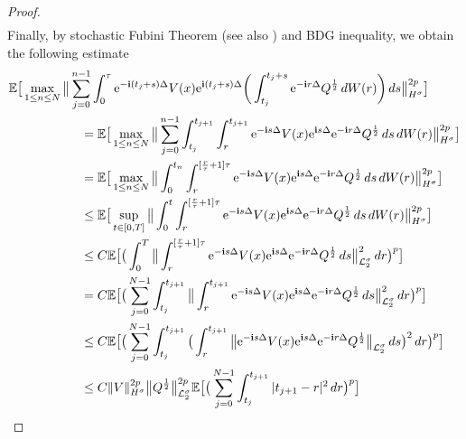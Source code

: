 \documentclass[a4paper]{amsart}
\begin{document}
\begin{proof}
\begin{align*}
\end{align*}
Finally, by stochastic Fubini Theorem (see also \cite{an_co}) and BDG inequality, we obtain the following estimate
\begin{align*}
&\mathbb{E}\big[\max_{1\le n\le N}\big\|\displaystyle\sum_{j=0}^{n-1}\int_{0}^{\tau}{\rm e}^{-{\bf i}(t_j+s)\Delta} V(x){\rm e}^{{\bf i}(t_j+s)\Delta}\bigg(\int_{t_j}^{t_j+s}{\rm e}^{-{\bf i}r \Delta}Q^{\frac{1}{2}}\,dW(r)\bigg)\,ds\big\|^{2p}_{H^\sigma}\big]\\
    &\hspace{2cm}=\mathbb{E}\big[\max_{1\le n\le N}\big\|\displaystyle\sum_{j=0}^{n-1}\int_{t_j}^{t_{j+1}}\int_{r}^{t_{j+1}}{\rm e}^{-{\bf i}s\Delta} V(x){\rm e}^{{\bf i}s\Delta}{\rm e}^{-{\bf i}r \Delta}Q^{\frac{1}{2}}\,ds\,dW(r)\big\|^{2p}_{H^\sigma}\big]\\
     &\hspace{2cm}=\mathbb{E}\big[\max_{1\le n\le N}\big\|\int_{0}^{t_{n}}\int_{r}^{[\frac{r}{\tau}+1]\tau}{\rm e}^{-{\bf i}s\Delta} V(x){\rm e}^{{\bf i}s\Delta}{\rm e}^{-{\bf i}r \Delta}Q^{\frac{1}{2}}\,ds\,dW(r)\big\|^{2p}_{H^\sigma}\big]\\
     &\hspace{2cm}\le \mathbb{E}\big[\displaystyle\sup_{t\in[0,T]}\big\|\int_{0}^{t}\int_{r}^{[\frac{r}{\tau}+1]\tau}{\rm e}^{-{\bf i}s\Delta} V(x){\rm e}^{{\bf i}s\Delta}{\rm e}^{-{\bf i}r \Delta}Q^{\frac{1}{2}}\,ds\,dW(r)\big\|^{2p}_{H^\sigma}\big]\\
     &\hspace{2cm} \le C \mathbb{E}\big[\big(\int_{0}^{T}\big\|\int_{r}^{[\frac{r}{\tau}+1]\tau}{\rm e}^{-{\bf i}s\Delta} V(x){\rm e}^{{\bf i}s\Delta}{\rm e}^{-{\bf i}r \Delta}Q^{\frac{1}{2}}\,ds\big\|^2_{\mathcal{L}_2^\sigma}\,dr\big)^p\big]\\
     &\hspace{2cm}= C \mathbb{E}\big[\big(\displaystyle\sum_{j=0}^{N-1}\int_{t_j}^{t_{j+1}}\big\|\int_{r}^{t_{j+1}}{\rm e}^{-{\bf i}s\Delta} V(x){\rm e}^{{\bf i}s\Delta}{\rm e}^{-{\bf i}r \Delta}Q^{\frac{1}{2}}\,ds\big\|^2_{\mathcal{L}_2^\sigma}\,dr\big)^p\big]\\
     &\hspace{2cm}\le C\mathbb{E}\big[\big(\displaystyle\sum_{j=0}^{N-1}\int_{t_j}^{t_{j+1}}\big(\int_{r}^{t_{j+1}}\big\|{\rm e}^{-{\bf i}s\Delta} V(x){\rm e}^{{\bf i}s\Delta}{\rm e}^{-{\bf i}r \Delta}Q^{\frac{1}{2}}\big\|_{\mathcal{L}_2^\sigma}\,ds\big)^2\,dr\big)^p\big]\\
     &\hspace{2cm}\le C\|V\|^{2p}_{H^\sigma}\big\|Q^{\frac{1}{2}}\big\|^{2p}_{\mathcal{L}_2^\sigma}\mathbb{E}\big[\big(\displaystyle\sum_{j=0}^{N-1}\int_{t_{j}}^{t_{j+1}}|t_{j+1}-r|^2\,dr\big)^p\big]\\

\end{align*}
\end{proof}
\end{document}
